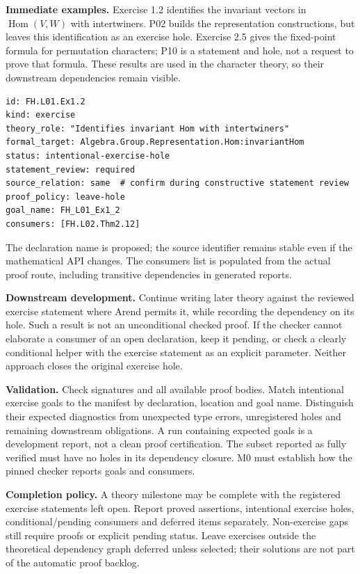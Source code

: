 \documentclass[11pt,a4paper]{article}
\newcommand{\Hom}{\operatorname{Hom}}
\begin{document}
\textbf{Immediate examples.} Exercise 1.2 identifies the invariant vectors
in $\Hom(V,W)$ with intertwiners. P02 builds the representation constructions,
but leaves this identification as an exercise hole. Exercise 2.5 gives the
fixed-point formula for permutation characters; P10 is a statement and hole,
not a request to prove that formula. These results are used in the character
theory, so their downstream dependencies remain visible.

\begin{lstlisting}
id: FH.L01.Ex1.2
kind: exercise
theory_role: "Identifies invariant Hom with intertwiners"
formal_target: Algebra.Group.Representation.Hom:invariantHom
status: intentional-exercise-hole
statement_review: required
source_relation: same  # confirm during constructive statement review
proof_policy: leave-hole
goal_name: FH_L01_Ex1_2
consumers: [FH.L02.Thm2.12]
\end{lstlisting}
The declaration name is proposed; the source identifier remains stable even
if the mathematical API changes. The consumers list is populated from the
actual proof route, including transitive dependencies in generated reports.

\textbf{Downstream development.} Continue writing later theory against the
reviewed exercise statement where Arend permits it, while recording the
dependency on its hole. Such a result is not an unconditional checked proof.
If the checker cannot elaborate a consumer of an open declaration, keep it
pending, or check a clearly conditional helper with the exercise statement
as an explicit parameter. Neither approach closes the original exercise hole.

\textbf{Validation.} Check signatures and all available proof bodies. Match
intentional exercise goals to the manifest by declaration, location and goal
name. Distinguish their expected diagnostics from unexpected type errors,
unregistered holes and remaining downstream obligations. A run containing
expected goals is a development report, not a clean proof certification.
The subset reported as fully verified must have no holes in its dependency
closure. M0 must establish how the pinned checker reports goals and consumers.

\textbf{Completion policy.} A theory milestone may be complete with the
registered exercise statements left open. Report proved assertions,
intentional exercise holes, conditional/pending consumers and deferred items
separately. Non-exercise gaps still require proofs or explicit pending status.
Leave exercises outside the theoretical dependency graph deferred unless
selected; their solutions are not part of the automatic proof backlog.
\end{document}
